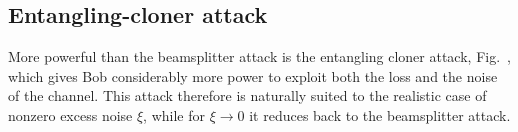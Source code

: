 \subsection{Entangling-cloner attack}
More powerful than the beamsplitter attack is the entangling cloner attack, Fig.~, which gives Bob considerably more power to exploit both the loss and the noise of the channel. This attack therefore is naturally suited to the realistic case of nonzero excess noise $\xi$, while for $\xi \rightarrow 0$ it reduces back to the beamsplitter attack.
